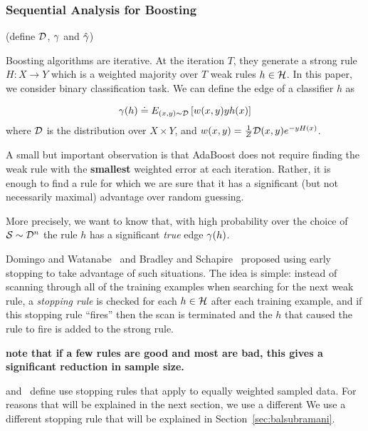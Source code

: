 \subsubsection{Sequential Analysis for Boosting}\label{sec:methods:early-stop}

(define ${\cal D}$, $\gamma$ and $\hat{\gamma}$)

Boosting algorithms are iterative.
At the iteration $T$, they generate a strong rule $H: X \rightarrow Y$
which is a weighted majority over $T$ weak rules $h \in \mathcal{H}$.
In this paper, we consider binary classification task.
We can define the edge of a classifier $h$ as

\begin{equation} \label{eqn:gamma_true}
\gamma(h) \doteq E_{(x,y) \sim {\cal D}} \left[ w(x,y) y h(x) \right]
\end{equation}
where ${\cal D}$ is the distribution over $X \times Y$,
and $w(x,y)=\frac{1}{Z} {\cal D}(x,y) e^{- y H(x)}$.


A small but important observation is that AdaBoost does not require
finding the weak rule with the {\bf smallest} weighted error at each
iteration. Rather, it is enough to find a rule for which we are sure
that it has a significant (but not necessarily maximal) advantage over
random guessing.


More precisely, we want to know that, with high
probability over the choice of ${\cal S} \sim {\cal D}^n$ the rule $h$
has a significant {\em true} edge $\gamma(h)$.

Domingo and Watanabe~\cite{domingo_scaling_2000} and Bradley and
Schapire~\cite{bradley_filterboost:_2007} proposed using early
stopping to take advantage of such situations. The idea is simple:
instead of scanning through all of the training examples when
searching for the next weak rule, a {\em stopping rule} is checked for
each $h \in \mathcal{H}$ after each training example, and if this stopping
rule ``fires'' then the scan is terminated and the $h$ that caused the
rule to fire is added to the strong rule.

{\bf note that if a few rules are good and most are bad, this gives a
  significant reduction in sample size.}

\cite{bradley_filterboost:_2007} and~\cite{domingo_scaling_2000}
define use stopping rules that apply to equally weighted sampled
data. For reasons that will be explained in the next section, we use a different
 We use a different stopping rule that will be explained in
 Section~\ref{sec:balsubramani}.

